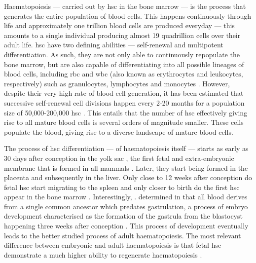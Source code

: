 Haematopoiesis --- carried out by \ac{hsc} in the bone marrow --- is the process that generates the entire population of blood cells. This happens continuously through life and approximately one trillion blood cells are produced everyday \cite{Hoggatt2013-jl} --- this amounts to a single individual producing almost 19 quadrillion cells over their adult life. \ac{hsc} have two defining abilities --- self-renewal and multipotent differentiation. As such, they are not only able to continuously repopulate the bone marrow, but are also capable of differentiating into all possible lineages of blood cells, including \ac{rbc} and \ac{wbc} (also known as erythrocytes and leukocytes, respectively) such as granulocytes, lymphocytes and monocytes \cite{Seita2010-ms,Till1961-mi,Becker1963-wm}. However, despite their very high rate of blood cell generation, it has been estimated that successive self-renewal cell divisions happen every 2-20 months for a population size of 50,000-200,000 \ac{hsc} \cite{Lee-Six2018-lp}. This entails that the number of \ac{hsc} effectively giving rise to all mature blood cells is several orders of magnitude smaller. These cells populate the blood, giving rise to a diverse landscape of mature blood cells.

The process of \ac{hsc} differentiation --- of haematopoiesis itself --- starts as early as 30 days after conception in the yolk sac \cite{Rieger2012-bh}, the first fetal and extra-embryonic membrane that is formed in all mammals \cite{Dong2018-se}. Later, they start being formed in the placenta and subsequently in the liver. Only close to 12 weeks after conception do fetal \ac{hsc} start migrating to the spleen and only closer to birth do the first \ac{hsc} appear in the bone marrow \cite{Rieger2012-bh}. Interestingly, . determined in \cite{Lee-Six2018-lp} that all blood derives from a single common ancestor which predates gastrulation, a process of embryo development characterised as the formation of the gastrula from the blastocyst happening three weeks after conception \cite{Muhr2020-ep}. This process of development eventually leads to the better studied process of adult haematopoiesis. The most relevant difference between embryonic and adult haematopoiesis is that fetal \ac{hsc} demonstrate a much higher ability to regenerate haematopoiesis \cite{Becker1965-xg,Holyoake1999-nz,Nicolini1999-xe}.

